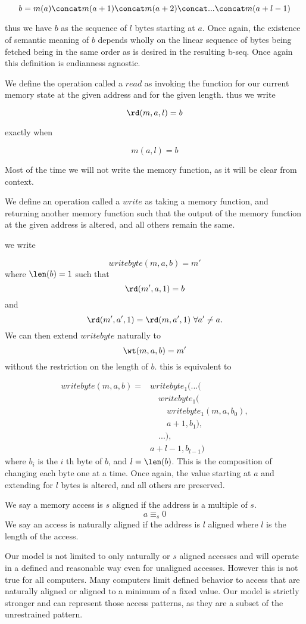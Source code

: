 \documentclass[11pt]{article}
\begin{document}
\[
b = m(a)\concat m(a+1) \concat m(a+2)\concat ... \concat m(a+l-1)
\]

thus we have \(b\) as the sequence of \(l\) bytes starting at \(a\). Once
again, the existence of semantic meaning of \(b\) depends wholly on the
linear sequence of bytes being fetched being in the same order as is
desired in the resulting b-seq. Once again this definition is
endianness agnostic.

We define the operation called a \(read\) as invoking the function for
our current memory state at the given address and for the given
length. thus we write

\[
\rd(m,a,l) = b
\]

exactly when

\[
m(a,l) = b
\]

Most of the time we will not write the memory function, as it will be
clear from context.

We define an operation called a \(write\) as taking a memory function, and
returning another memory function such that the output of the memory
function at the given address is altered, and all others remain the
same.

we write

\[
writebyte(m,a,b) = m'
\]
where \(\len(b) = 1\) such that
\[
\rd(m',a,1) = b
\]
and
\[
\rd(m',a',1) = \rd(m,a',1) \ \forall a'\neq a.
\]
We can then extend \(writebyte\) naturally to
\[
\wt(m,a,b) = m'
\]
without the restriction on the length of \(b\). this is equivalent to

\begin{align*}
writebyte(m,a,b) =& writebyte_1(...(\\
&\quad writebyte_1(\\
&\quad\quad writebyte_1(m,a,b_0),\\
&\quad\quad a+1, b_1),\\
&\quad ...),\\
&a+l-1, b_{l-1})
\end{align*}
where \(b_i\) is the \(i\) th byte of \(b\), and \(l = \len(b)\). This is the
composition of changing each byte one at a time. Once again, the value
starting at \(a\) and extending for \(l\) bytes is altered, and all others
are preserved.

We say a memory access is \(s\) aligned if the address is a
multiple of \(s\).
\[
a \equiv_s 0
\]
We say an access is naturally aligned if the address is \(l\) aligned
where \(l\) is the length of the access.

Our model is not limited to only naturally or \(s\) aligned accesses and
will operate in a defined and reasonable way even for unaligned
accesses. However this is not true for all computers. Many computers
limit defined behavior to access that are naturally aligned or aligned
to a minimum of a fixed value. Our model is strictly stronger and can
represent those access patterns, as they are a subset of the
unrestrained pattern.
\end{document}
